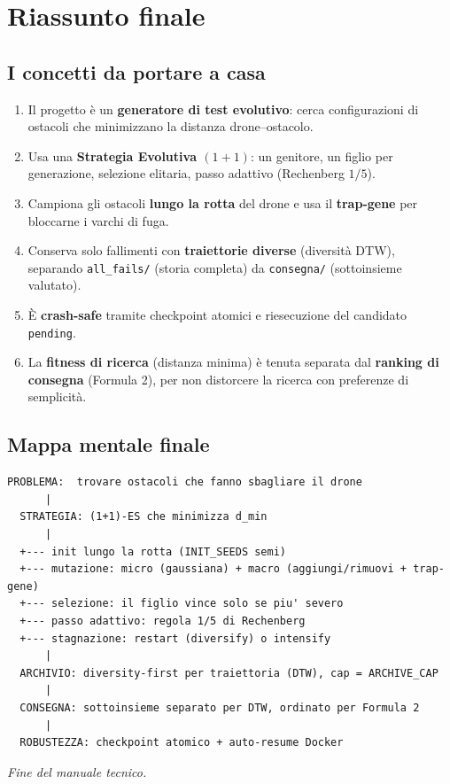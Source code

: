 \documentclass[11pt,a4paper]{report}
\newcommand{\code}[1]{\texttt{#1}}
\begin{document}
\chapter{Riassunto finale}

\section{I concetti da portare a casa}
\begin{enumerate}
  \item Il progetto è un \textbf{generatore di test evolutivo}: cerca
        configurazioni di ostacoli che minimizzano la distanza
        drone--ostacolo.
  \item Usa una \textbf{Strategia Evolutiva $(1+1)$}: un genitore, un
        figlio per generazione, selezione elitaria, passo adattivo
        (Rechenberg $1/5$).
  \item Campiona gli ostacoli \textbf{lungo la rotta} del drone e usa il
        \textbf{trap-gene} per bloccarne i varchi di fuga.
  \item Conserva solo fallimenti con \textbf{traiettorie diverse}
        (diversità DTW), separando \code{all\_fails/} (storia completa)
        da \code{consegna/} (sottoinsieme valutato).
  \item È \textbf{crash-safe} tramite checkpoint atomici e riesecuzione
        del candidato \code{pending}.
  \item La \textbf{fitness di ricerca} (distanza minima) è tenuta
        separata dal \textbf{ranking di consegna} (Formula 2), per non
        distorcere la ricerca con preferenze di semplicità.
\end{enumerate}

\section{Mappa mentale finale}
\begin{lstlisting}[style=ascii]
  PROBLEMA:  trovare ostacoli che fanno sbagliare il drone
      |
  STRATEGIA: (1+1)-ES che minimizza d_min
      |
  +--- init lungo la rotta (INIT_SEEDS semi)
  +--- mutazione: micro (gaussiana) + macro (aggiungi/rimuovi + trap-gene)
  +--- selezione: il figlio vince solo se piu' severo
  +--- passo adattivo: regola 1/5 di Rechenberg
  +--- stagnazione: restart (diversify) o intensify
      |
  ARCHIVIO: diversity-first per traiettoria (DTW), cap = ARCHIVE_CAP
      |
  CONSEGNA: sottoinsieme separato per DTW, ordinato per Formula 2
      |
  ROBUSTEZZA: checkpoint atomico + auto-resume Docker
\end{lstlisting}

\vfill
\begin{center}
\emph{Fine del manuale tecnico.}
\end{center}
\end{document}
